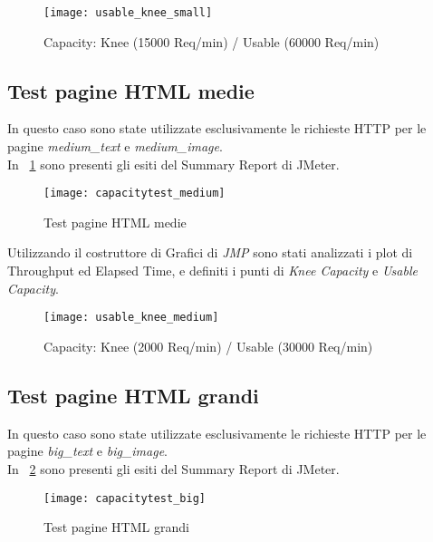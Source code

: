 \begin{figure}[!htbp]
  \centering
  \texttt{[image: usable\_knee\_small]}
  \caption{Capacity: Knee (15000 Req/min) / Usable (60000 Req/min)}
\end{figure}

\subsection{Test pagine HTML medie}
In questo caso sono state utilizzate esclusivamente le richieste HTTP per le pagine
\textit{medium\_text} e \textit{medium\_image}.\\
In \figurename~\ref{medium_page_summary_report} sono presenti gli esiti del
Summary Report di JMeter.\\

\begin{figure}[!htbp]
  \centering
  \texttt{[image: capacitytest\_medium]}
  \caption{Test pagine HTML medie}
  \label{medium_page_summary_report}
\end{figure}

Utilizzando il costruttore di Grafici di \textit{JMP} sono stati analizzati i plot
di Throughput ed Elapsed Time, e definiti i punti di \textit{Knee Capacity} e
\textit{Usable Capacity}.\\

\begin{figure}[!htbp]
  \centering
  \texttt{[image: usable\_knee\_medium]}
  \caption{Capacity: Knee (2000 Req/min) / Usable (30000 Req/min)}
\end{figure}

\clearpage

\subsection{Test pagine HTML grandi}
In questo caso sono state utilizzate esclusivamente le richieste HTTP per le pagine
\textit{big\_text} e \textit{big\_image}.\\
In \figurename~\ref{big_page_summary_report} sono presenti gli esiti del
Summary Report di JMeter.\\

\begin{figure}[!htbp]
  \centering
  \texttt{[image: capacitytest\_big]}
  \caption{Test pagine HTML grandi}
  \label{big_page_summary_report}
\end{figure}

